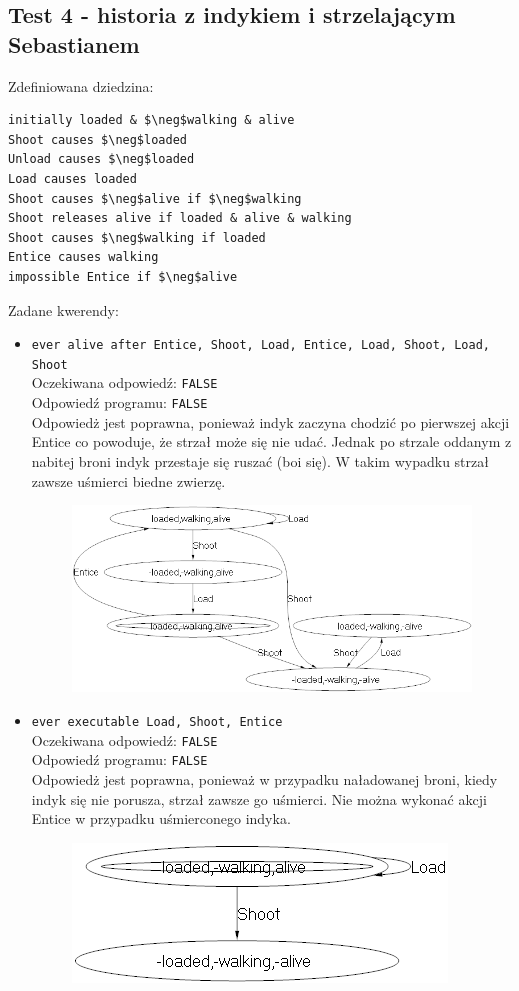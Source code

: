 \documentclass{article}
\begin{document}
\subsection{Test 4 - historia z indykiem i strzelającym Sebastianem}
Zdefiniowana dziedzina:
\bigskip
{}
\begin{lstlisting}[mathescape=true]
initially loaded & $\neg$walking & alive
Shoot causes $\neg$loaded
Unload causes $\neg$loaded
Load causes loaded
Shoot causes $\neg$alive if $\neg$walking
Shoot releases alive if loaded & alive & walking
Shoot causes $\neg$walking if loaded
Entice causes walking
impossible Entice if $\neg$alive
\end{lstlisting}
\vspace{1cm}
Zadane kwerendy:
\begin{itemize}
	\item {\large\texttt{ever alive after Entice, Shoot, Load, Entice, Load, Shoot, Load, Shoot}}\\
	Oczekiwana odpowiedź: \texttt{FALSE}\\
	Odpowiedź programu: \texttt{FALSE}\\
	Odpowiedż jest poprawna, ponieważ indyk zaczyna chodzić po pierwszej akcji Entice co powoduje, że strzał może się nie udać. Jednak po strzale oddanym z nabitej broni indyk przestaje się ruszać (boi się). W takim wypadku strzał zawsze uśmierci biedne zwierzę.
	\begin{figure}[H]
		\centering
		\includegraphics[scale=0.6]{kwerenda1}
	\end{figure}
	
	\item {\large\texttt{ever executable Load, Shoot, Entice}}\\
	Oczekiwana odpowiedź: \texttt{FALSE}\\
	Odpowiedź programu: \texttt{FALSE}\\
	Odpowiedż jest poprawna, ponieważ w przypadku naładowanej broni, kiedy indyk się nie porusza, strzał zawsze go uśmierci. Nie można wykonać akcji Entice w przypadku uśmierconego indyka.
	\begin{figure}[H]
		\centering
		\includegraphics[scale=0.6]{kwerenda2}
	\end{figure}
	

\end{itemize}
\end{document}
